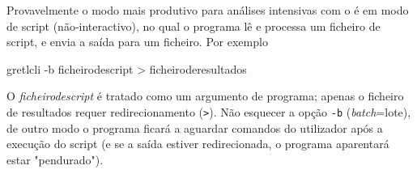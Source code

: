 Provavelmente o modo mais produtivo para análises intensivas com o
 é em modo de script (não-interactivo), no qual o
programa lê e processa um ficheiro de script, e envia a saída
para um ficheiro.  Por exemplo
\begin{code}
gretlcli -b ficheirodescript > ficheiroderesultados
\end{code}

O \textsl{ficheirodescript} é tratado como um argumento de programa; apenas o ficheiro de resultados requer redirecionamento (\verb|>|).  Não esquecer a opção \texttt{-b}
(\textit{batch}=lote), de outro modo o programa ficará a aguardar comandos do
utilizador após a execução do script (e se a saída estiver redirecionada, o programa aparentará estar "pendurado").

    


